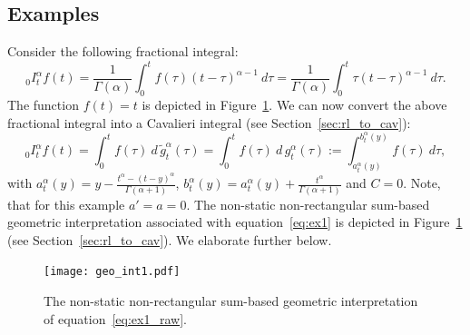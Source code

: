 \documentclass[twoside,reqno,11pt]{fcaa-var} %
\begin{document}
\subsection{Examples}
Consider the following fractional integral:
\begin{equation}
\label{eq:ex1_raw}
_0I_t^{\alpha} f(t) = \frac{1}{\Gamma(\alpha)}\int_0^t f(\tau) (t-\tau)^{\alpha-1}~d\tau = \frac{1}{\Gamma(\alpha)}\int_0^t \tau(t-\tau)^{\alpha-1}~d\tau. 
\end{equation}
The function $f(t) = t$ is depicted in Figure~\ref{fig:geo1}. We can now convert the above fractional integral into a Cavalieri integral (see Section~\ref{sec:rl_to_cav}):
\begin{equation}
\label{eq:ex1}
_0I_t^{\alpha} f(t) = \int_0^t f(\tau)~d\,\widetilde{g}_t^{\alpha}(\tau)=\int_0^t f(\tau)~d\,g_t^{\alpha}(\tau):=\int_{a_t^{\alpha}(y)}^{b_t^{\alpha}(y)} f(\tau)~d\tau,
\end{equation}
with $a_t^{\alpha}(y) = y - \frac{t^{\alpha}-(t-y)^{\alpha}}{\Gamma(\alpha+1)}$, $b_t^{\alpha}(y) = a_t^{\alpha}(y) + \frac{t^{\alpha}}{\Gamma(\alpha+1)}$ and $C=0$.
Note, that for this example $a'=a=0$. The non-static non-rectangular sum-based geometric interpretation associated with equation~\ref{eq:ex1} is depicted in Figure~\ref{fig:geo1} (see Section~\ref{sec:rl_to_cav}). We elaborate further below.\\  

\begin{figure}[htb]
\centering
\texttt{[image: geo\_int1.pdf]}
\caption{The non-static non-rectangular sum-based geometric interpretation of equation~\eqref{eq:ex1_raw}.}
\label{fig:geo1}
\end{figure}

\end{document}
